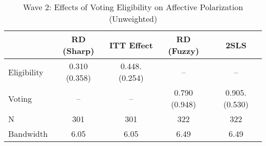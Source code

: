 \begin{table}[htbp]
\centering
\caption{Wave 2: Effects of Voting Eligibility on Affective Polarization (Unweighted)}
\label{tab:wave2_un}
\begin{tabular}{lcccc}
\hline
 & RD (Sharp) & ITT Effect & RD (Fuzzy) & 2SLS \\
\hline
Eligibility & 0.310 (0.358) & 0.448. (0.254) & -- & -- \\
Voting & -- & -- & 0.790 (0.948) & 0.905. (0.530) \\
\hline
N & 301 & 301 & 322 & 322 \\
Bandwidth & 6.05 & 6.05 & 6.49 & 6.49 \\
\hline
\end{tabular}
\end{table}
